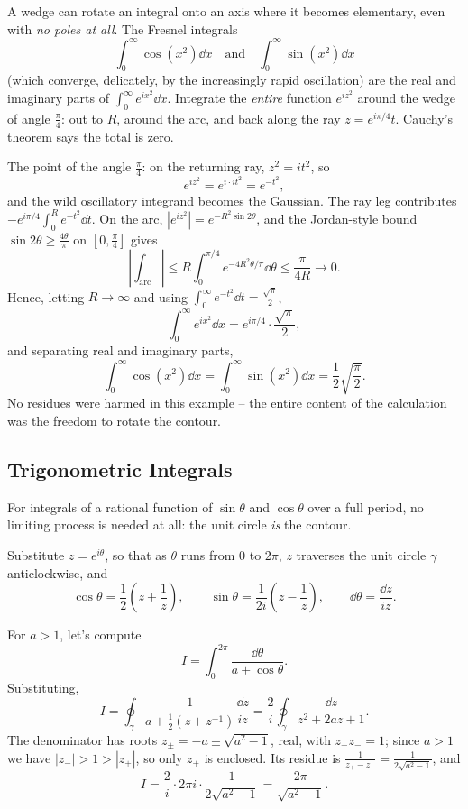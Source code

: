 \begin{example}
	A wedge can rotate an integral onto an axis where it becomes elementary, even with \emph{no poles at all}. The Fresnel integrals
	$$
	\int_0^\infty \cos(x^2) \dd x \quad \text{and} \quad \int_0^\infty \sin(x^2) \dd x
	$$
	(which converge, delicately, by the increasingly rapid oscillation) are the real and imaginary parts of $\int_0^\infty e^{ix^2} \dd x$. Integrate the \emph{entire} function $e^{iz^2}$ around the wedge of angle $\frac{\pi}{4}$: out to $R$, around the arc, and back along the ray $z = e^{i\pi/4} t$. Cauchy's theorem says the total is zero.

	The point of the angle $\frac \pi 4$: on the returning ray, $z^2 = it^2$, so
	$$
	e^{iz^2} = e^{i \cdot it^2} = e^{-t^2},
	$$
	and the wild oscillatory integrand becomes the Gaussian. The ray leg contributes $-e^{i\pi/4}\int_0^R e^{-t^2} \dd t$. On the arc, $|e^{iz^2}| = e^{-R^2 \sin 2\theta}$, and the Jordan-style bound $\sin 2\theta \geq \frac{4\theta}{\pi}$ on $[0, \frac \pi 4]$ gives
	$$
	\left|\int_{\text{arc}}\right| \leq R \int_0^{\pi/4} e^{-4R^2 \theta/\pi} \dd \theta \leq \frac{\pi}{4R} \to 0.
	$$
	Hence, letting $R \to \infty$ and using $\int_0^\infty e^{-t^2} \dd t = \frac{\sqrt \pi}{2}$,
	$$
	\int_0^\infty e^{ix^2} \dd x = e^{i\pi/4} \cdot \frac{\sqrt\pi}{2},
	$$
	and separating real and imaginary parts,
	$$
	\int_0^\infty \cos(x^2) \dd x = \int_0^\infty \sin(x^2) \dd x = \frac 12 \sqrt{\frac{\pi}{2}}.
	$$
	No residues were harmed in this example -- the entire content of the calculation was the freedom to rotate the contour.
\end{example}

\subsection{Trigonometric Integrals}

For integrals of a rational function of $\sin\theta$ and $\cos\theta$ over a full period, no limiting process is needed at all: the unit circle \emph{is} the contour.

Substitute $z = e^{i\theta}$, so that as $\theta$ runs from $0$ to $2\pi$, $z$ traverses the unit circle $\gamma$ anticlockwise, and
$$
\cos \theta = \frac{1}{2}\left(z + \frac 1z\right), \qquad \sin\theta = \frac{1}{2i}\left(z - \frac 1z\right), \qquad \dd \theta = \frac{\dd z}{iz}.
$$

\begin{example}
	For $a > 1$, let's compute
	$$
	I = \int_0^{2\pi} \frac{\dd \theta}{a + \cos\theta}.
	$$
	Substituting,
	$$
	I = \oint_\gamma \frac{1}{a + \frac 12 (z + z^{-1})} \frac{\dd z}{iz} = \frac{2}{i}\oint_\gamma \frac{\dd z}{z^2 + 2az + 1}.
	$$
	The denominator has roots $z_\pm = -a \pm \sqrt{a^2 - 1}$, real, with $z_+ z_- = 1$; since $a > 1$ we have $|z_-| > 1 > |z_+|$, so only $z_+$ is enclosed. Its residue is $\frac{1}{z_+ - z_-} = \frac{1}{2\sqrt{a^2 - 1}}$, and
	$$
	I = \frac{2}{i} \cdot 2\pi i \cdot \frac{1}{2\sqrt{a^2 - 1}} = \frac{2\pi}{\sqrt{a^2 - 1}}.
	$$
\end{example}

